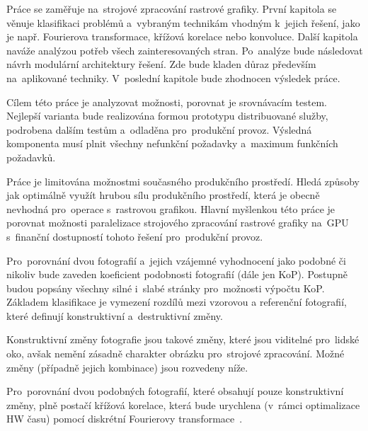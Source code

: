 
Práce se zaměřuje na~strojové zpracování rastrové grafiky. První kapitola se věnuje klasifikaci problémů a~vybraným technikám vhodným k~jejich řešení, jako je např. Fourierova transformace, křížová korelace nebo konvoluce. Další kapitola naváže analýzou potřeb všech zainteresovaných stran. Po~analýze bude následovat návrh modulární architektury řešení. Zde bude kladen důraz především na~aplikované techniky. V~poslední kapitole bude zhodnocen výsledek práce.

Cílem této práce je analyzovat možnosti, porovnat je srovnávacím testem. Nejlepší varianta bude realizována formou prototypu distribuované služby, podrobena dalším testům a~odladěna pro~produkční provoz. Výsledná komponenta musí plnit všechny nefunkční požadavky a~maximum funkčních požadavků.

Práce je limitována možnostmi současného produkčního prostředí. Hledá způsoby jak optimálně využít hrubou sílu produkčního prostředí, která je obecně nevhodná pro~operace s~rastrovou grafikou. Hlavní myšlenkou této práce je porovnat možnosti paralelizace strojového zpracování rastrové grafiky na~GPU s~finanční dostupností tohoto řešení pro~produkční provoz. 


Pro~porovnání dvou fotografií a~jejich vzájemné vyhodnocení jako podobné či nikoliv bude zaveden koeficient podobnosti fotografií (dále jen KoP). Postupně budou popsány všechny silné i~slabé stránky pro~možnosti výpočtu KoP. Základem klasifikace je vymezení rozdílů mezi vzorovou a referenční fotografií, které definují konstruktivní a~destruktivní změny.

Konstruktivní změny fotografie jsou takové změny, které jsou viditelné pro~lidské oko, avšak nemění zásadně charakter obrázku pro~strojové zpracování. Možné změny (případně jejich kombinace) jsou rozvedeny níže.

Pro~porovnání dvou podobných fotografií, které obsahují pouze konstruktivní změny, plně postačí křížová korelace, která bude urychlena (v~rámci optimalizace HW času) pomocí diskrétní Fourierovy transformace~\cite{FFT}.


